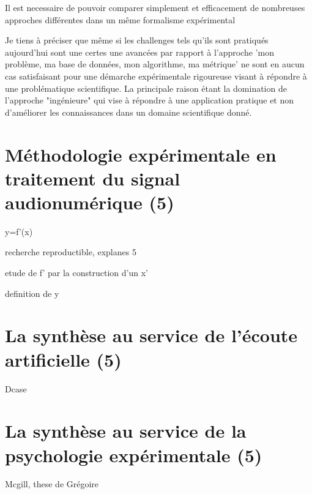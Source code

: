  Il est necessaire de pouvoir comparer simplement et efficacement de nombreuses approches différentes dans un même formalisme expérimental


Je tiens à préciser que même si les challenges tels qu'ils sont pratiqués aujourd'hui sont une certes une avancées par rapport à l'approche 'mon problème, ma base de données, mon algorithme, ma métrique' ne sont en aucun cas satisfaisant pour une démarche expérimentale rigoureuse visant à répondre à une problématique scientifique. La principale raison étant la domination de l'approche "ingénieure" qui vise à répondre à une application pratique et non d'améliorer les connaissances dans un domaine scientifique donné.

\section{Méthodologie expérimentale en traitement du signal audionumérique (5)}

y=f'(x)

recherche reproductible, explanes 5

etude de f' par la construction d'un x'

definition de y

\section{La synthèse au service de l'écoute artificielle (5)}

Dcase

\section{La synthèse au service de la psychologie expérimentale (5)}

Mcgill, these de Grégoire
